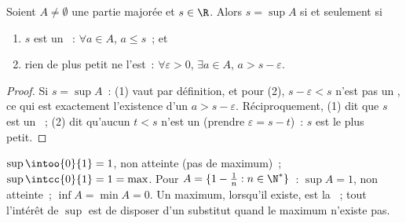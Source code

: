 \begin{proposition}\label{prop:b1:reals:epsilon}
Soient $A \neq \emptyset$ une partie majorée et $s \in \R$. Alors $s =
\sup A$ si et seulement si
\begin{enumerate}
  \item $s$ est un ~: $\forall a \in A$, $a \leq s$~; et
  \item rien de plus petit ne l'est~: $\forall \varepsilon > 0$,
        $\exists a \in A$, $a > s - \varepsilon$.
\end{enumerate}
\end{proposition}

\begin{proof}
Si $s = \sup A$~: (1) vaut par définition, et pour (2), $s -
\varepsilon < s$ n'est pas un , ce qui est exactement
l'existence d'un $a > s - \varepsilon$. Réciproquement, (1) dit que
$s$ est un ~; (2) dit qu'aucun $t < s$ n'est un 
(prendre $\varepsilon = s - t$)~: $s$ est le plus petit.
\end{proof}

\begin{example}\label{ex:b1:reals:supexamples}
$\sup \intoo{0}{1} = 1$, non atteinte (pas de maximum)~;
$\sup \intcc{0}{1} = 1 = \max$. Pour $A = \{1 - \frac 1n : n \in
\N^*\}$~: $\sup A = 1$, non atteinte~; $\inf A = \min A = 0$. Un
maximum, lorsqu'il existe, est la ~; tout l'intérêt
de $\sup$ est de disposer d'un substitut quand le maximum n'existe
pas.
\end{example}

